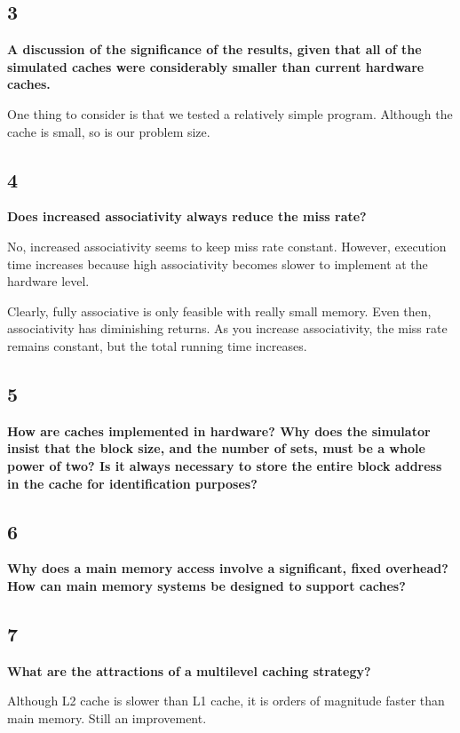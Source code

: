 \documentclass[letterpaper, 12pt, oneside]{memoir}
\begin{document}
\subsection{3}
\textbf{A discussion of the significance of the results, given that all of the
simulated caches were considerably smaller than current hardware caches.}

One thing to consider is that we tested a relatively simple program. Although
the cache is small, so is our problem size. 

\subsection{4}
\textbf{Does increased associativity always reduce the miss rate?}

No, increased associativity seems to keep miss rate constant. However, execution
time increases because high associativity becomes slower to implement at 
the hardware level.

Clearly, fully associative is only feasible with really small memory. Even then, 
associativity has diminishing returns. As you increase associativity, the miss
rate remains constant, but the total running time increases.

\subsection{5}
\textbf{How are caches implemented in hardware? Why does the simulator insist
that the block size, and the number of sets, must be a whole power of two? Is it always
necessary to store the entire block address in the cache for identification
purposes?}


\subsection{6}
\textbf{Why does a main memory access involve a significant, fixed overhead? How
can main memory systems be designed to support caches?}


\subsection{7}
\textbf{What are the attractions of a multilevel caching strategy?}

Although L2 cache is slower than L1 cache, it is orders of magnitude faster
than main memory. Still an improvement.
\end{document}
